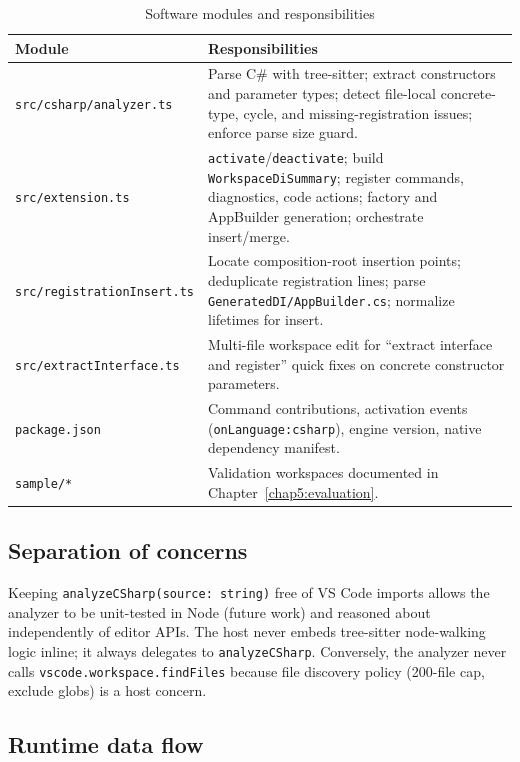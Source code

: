 \begin{table}[htbp]
\centering
\caption{Software modules and responsibilities}
\label{tab:modules}
\begin{tabular}{|l|p{9.2cm}|}
\hline
\textbf{Module} & \textbf{Responsibilities} \\
\hline
\texttt{src/csharp/analyzer.ts} & Parse C\# with tree-sitter; extract constructors and parameter types; detect file-local concrete-type, cycle, and missing-registration issues; enforce parse size guard. \\
\hline
\texttt{src/extension.ts} & \texttt{activate}/\texttt{deactivate}; build \texttt{WorkspaceDiSummary}; register commands, diagnostics, code actions; factory and AppBuilder generation; orchestrate insert/merge. \\
\hline
\texttt{src/registrationInsert.ts} & Locate composition-root insertion points; deduplicate registration lines; parse \texttt{GeneratedDI/AppBuilder.cs}; normalize lifetimes for insert. \\
\hline
\texttt{src/extractInterface.ts} & Multi-file workspace edit for ``extract interface and register'' quick fixes on concrete constructor parameters. \\
\hline
\texttt{package.json} & Command contributions, activation events (\texttt{onLanguage:csharp}), engine version, native dependency manifest. \\
\hline
\texttt{sample/*} & Validation workspaces documented in Chapter~\ref{chap5:evaluation}. \\
\hline
\end{tabular}
\end{table}

\subsection{Separation of concerns}

Keeping \texttt{analyzeCSharp(source: string)} free of VS Code imports allows the analyzer to be unit-tested in Node (future work) and reasoned about independently of editor APIs. The host never embeds tree-sitter node-walking logic inline; it always delegates to \texttt{analyzeCSharp}. Conversely, the analyzer never calls \texttt{vscode.workspace.findFiles} because file discovery policy (200-file cap, exclude globs) is a host concern.

\subsection{Runtime data flow}

